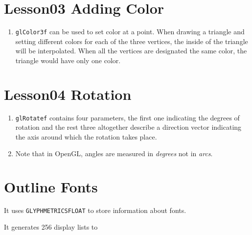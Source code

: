 \section{Lesson03 Adding Color}
\begin{enumerate}
	\item \verb|glColor3f| can be used to set color at a point. When drawing a triangle and setting different colors for each of the three vertices, the inside of the triangle will be interpolated. When all the vertices are designated the same color, the triangle would have only one color.
\end{enumerate}

\section{Lesson04 Rotation}
\begin{enumerate}
	\item \verb|glRotatef| contains four parameters, the first one indicating the degrees of rotation and the rest three altogether describe a direction vector indicating the axis around which the rotation takes place.
	\item Note that in OpenGL, angles are measured in \emph{degrees} not in \emph{arcs}.
\end{enumerate}

\section{Outline Fonts}

It uses \verb|GLYPHMETRICSFLOAT| to store information about fonts.

It generates 256 display lists to 


